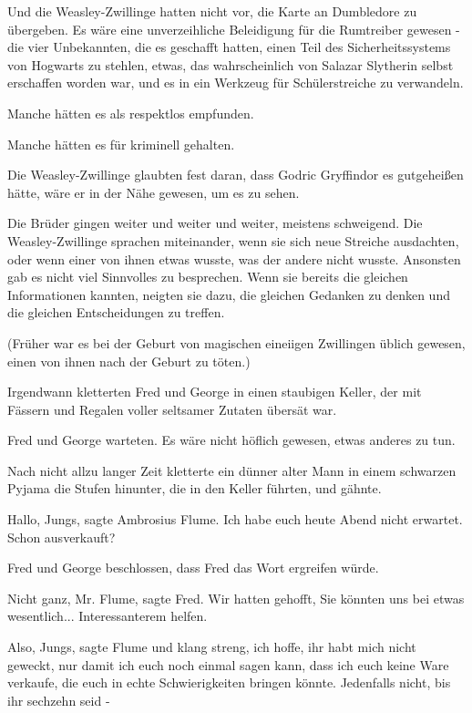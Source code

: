 Und die Weasley-Zwillinge hatten nicht vor, die Karte an Dumbledore zu
übergeben. Es wäre eine unverzeihliche Beleidigung für die Rumtreiber gewesen -
die vier Unbekannten, die es geschafft hatten, einen Teil des Sicherheitssystems
von Hogwarts zu stehlen, etwas, das wahrscheinlich von Salazar Slytherin selbst
erschaffen worden war, und es in ein Werkzeug für Schülerstreiche zu verwandeln.

Manche hätten es als respektlos empfunden.

Manche hätten es für kriminell gehalten.

Die Weasley-Zwillinge glaubten fest daran, dass Godric Gryffindor es gutgeheißen
hätte, wäre er in der Nähe gewesen, um es zu sehen.

Die Brüder gingen weiter und weiter und weiter, meistens schweigend. Die
Weasley-Zwillinge sprachen miteinander, wenn sie sich neue Streiche ausdachten,
oder wenn einer von ihnen etwas wusste, was der andere nicht wusste. Ansonsten
gab es nicht viel Sinnvolles zu besprechen. Wenn sie bereits die gleichen
Informationen kannten, neigten sie dazu, die gleichen Gedanken zu denken und die
gleichen Entscheidungen zu treffen.

(Früher war es bei der Geburt von magischen eineiigen Zwillingen üblich gewesen,
einen von ihnen nach der Geburt zu töten.)

Irgendwann kletterten Fred und George in einen staubigen Keller, der mit Fässern
und Regalen voller seltsamer Zutaten übersät war.

Fred und George warteten. Es wäre nicht höflich gewesen, etwas anderes zu tun.

Nach nicht allzu langer Zeit kletterte ein dünner alter Mann in einem schwarzen
Pyjama die Stufen hinunter, die in den Keller führten, und gähnte.

\glqq{}Hallo, Jungs\grqq{}, sagte Ambrosius Flume. \glqq{}Ich habe euch heute
Abend nicht erwartet. Schon ausverkauft?\grqq{}

Fred und George beschlossen, dass Fred das Wort ergreifen würde.

\glqq{}Nicht ganz, Mr. Flume\grqq{}, sagte Fred. \glqq{}Wir hatten gehofft, Sie
könnten uns bei etwas wesentlich... Interessanterem helfen.\grqq{}

\glqq{}Also, Jungs\grqq{}, sagte Flume und klang streng, \glqq{}ich hoffe, ihr
habt mich nicht geweckt, nur damit ich euch noch einmal sagen kann, dass ich
euch keine Ware verkaufe, die euch in echte Schwierigkeiten bringen könnte.
Jedenfalls nicht, bis ihr sechzehn seid -\grqq{}

